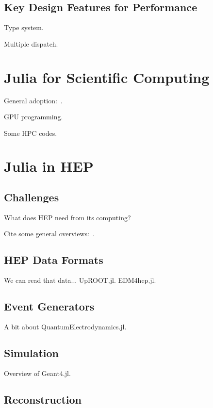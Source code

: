 \documentclass{webofc}
\begin{document}
\subsection{Key Design Features for Performance}

Type system.

Multiple dispatch.

\section{Julia for Scientific Computing}

General adoption:~\cite{perkel-julia-science}.

GPU programming.

Some HPC codes.

\section{Julia in HEP}

\subsection{Challenges}

What does HEP need from its computing?

Cite some general overviews:~\cite{Stanitzki:2020bnx,eschle2023potential}.

\subsection{HEP Data Formats}

We can read that data... UpROOT.jl. EDM4hep.jl.

\subsection{Event Generators}

A bit about QuantumElectrodynamics.jl.

\subsection{Simulation}

Overview of Geant4.jl.

\subsection{Reconstruction}
\end{document}
